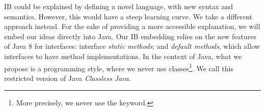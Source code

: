 

IB could be explained by defining a novel language, with new syntax
and semantics. However, this would have a steep learning curve.  We
take a different approach instead. For the sake of providing a more
accessible explanation, we will embed our ideas directly into Java. 
Our IB embedding relies on the
new features of Java 8 for interfaces: interface \emph{static methods}; and
\emph{default methods}, which allow interfaces to have method
implementations. In the context of Java, what we propose is a programming
style, where we never use classes\footnote{More precisely, we never
  use the \Q@class@ keyword.}.  We call this restricted version of
Java \emph{Classless Java}. 


%
%
%
%

